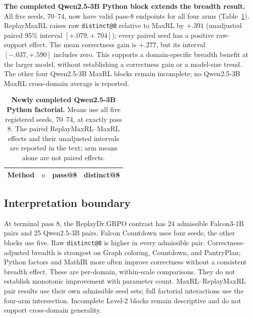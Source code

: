\documentclass{article}
\newcommand{\1}{\mathbf 1}
\theoremstyle{remark}
\theoremstyle{definition}
\theoremstyle{plain}
\begin{document}
\textbf{The completed Qwen2.5-3B Python block extends the breadth result.}
All five seeds, 70--74, now have valid pass-8 endpoints for all four arms
(Table~\ref{tab:qwen3b-python-factorial}). ReplayMaxRL raises raw
\texttt{distinct@8} relative to MaxRL by \(+.391\)
(unadjusted paired 95\% interval \([+.079,+.704]\)); every paired seed has a
positive raw-support effect. The mean correctness gain is \(+.277\), but its
interval \([-.037,+.590]\) includes zero. This supports a domain-specific
breadth benefit at the larger model, without establishing a correctness gain
or a model-size trend. The other four Qwen2.5-3B MaxRL blocks remain incomplete;
no Qwen2.5-3B MaxRL cross-domain average is reported.

\begin{table}[H]
  \centering
  \caption{\textbf{Newly completed Qwen2.5-3B Python factorial.}
  Means use all five registered seeds, 70--74, at exactly pass 8.
  The paired ReplayMaxRL--MaxRL effects and their unadjusted intervals are
  reported in the text; arm means alone are not paired effects.}
  \label{tab:qwen3b-python-factorial}
  \small
  \begin{tabular}{@{}lrrr@{}}
    \toprule
    \textbf{Method} & \(n\) & \textbf{pass@8} & \textbf{distinct@8} \\
    \midrule
    
  \end{tabular}
\end{table}

\subsection{Interpretation boundary}
\label{app:scale-boundary}

At terminal pass 8, the ReplayDr.GRPO contrast has 24 admissible Falcon3-1B
pairs and 25 Qwen2.5-3B pairs. Falcon Countdown uses four seeds; the other
blocks use five. Raw \texttt{distinct@8} is higher in every admissible pair. Correctness-adjusted
breadth is strongest on Graph coloring, Countdown, and PantryPlan; Python
factors and MathIR more often improve correctness without a consistent breadth effect. These are per-domain,
within-scale comparisons. They do not establish monotonic improvement with
parameter count. MaxRL--ReplayMaxRL pair results use their own admissible seed sets;
full factorial interactions use the four-arm intersection. Incomplete Level-2
blocks remain descriptive and do not support cross-domain generality.
\end{document}
